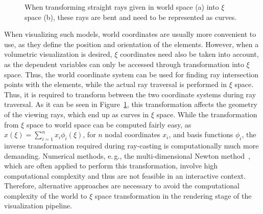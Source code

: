 \documentclass[review,journal]{vgtc}         %
\begin{document}
\begin{figure}[t]
    \centering
    \hspace*{0.5cm}
    \caption{When transforming straight rays given in world space (a) into $\xi$ space (b), these rays are bent and need to be represented as curves.}
    \label{fig:raycoords}
\end{figure}

When visualizing such models, world coordinates are usually more convenient to use, as they define the position and orientation of the elements. However, when a volumetric visualization is desired, $\xi$ coordinates need also be taken into account, as the dependent variables can only be accessed through transformation into $\xi$ space. Thus, the world coordinate system can be used for finding ray intersection points with the elements, while the actual ray traversal is performed in $\xi$ space. Thus, it is required to transform between the two coordinate systems during ray traversal. As it can be seen in Figure~\ref{fig:raycoords}, this transformation affects the geometry of the viewing rays, which end up as curves in $\xi$ space. While the transformation from $\xi$ space to world space can be computed fairly easy, as $x(\xi)=\sum_{i=1}^n x_i \phi_i(\xi)$, for $n$ nodal coordinates $x_i$, and basis functions $\phi_i$, the inverse transformation required during ray-casting is computationally much more demanding. Numerical methods, e.\,g., the multi-dimensional Newton method~\cite{Press92}, which are often applied to perform this transformation, involve high computational complexity and thus are not feasible in an interactive context. Therefore, alternative approaches are necessary to avoid the computational complexity of the world to $\xi$ space transformation in the rendering stage of the visualization pipeline.
\end{document}
